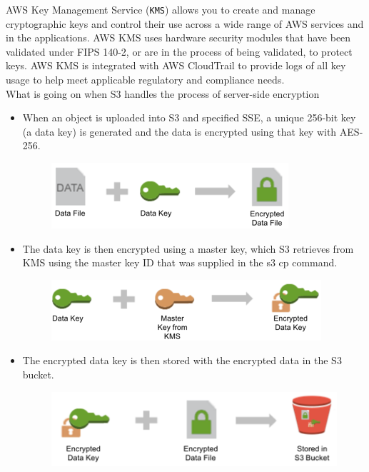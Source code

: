 \documentclass[10pt]{article}
\begin{document}
AWS Key Management Service (\texttt{KMS}) allows you to create and manage cryptographic keys and control their use across a wide range of AWS services and in the applications. AWS KMS uses hardware security modules that have been validated under FIPS 140-2, or are in the process of being validated, to protect keys. AWS KMS is integrated with AWS CloudTrail to provide logs of all key usage to help meet applicable regulatory and compliance needs. \cite{aws-kms}
\\
What is going on when S3 handles the process of server-side encryption \cite{encryption-with-aws-kms}
\begin{itemize}
    \item When an object is uploaded into S3 and specified SSE, a unique 256-bit key (a data key) is generated and the data is encrypted using that key with AES-256.
    \begin{figure}[h!]
    	\centering
    	\includegraphics[width=0.4\linewidth]{images/KMSDiagram1.PNG}	
    \end{figure}
    \item The data key is then encrypted using a master key, which S3 retrieves from KMS using the master key ID that was supplied in the s3 cp command.
   \begin{figure}[h!]
   	\centering
   	\includegraphics[width=0.4\linewidth]{images/KMSDiagram2.PNG}	
   \end{figure}
    \item The encrypted data key is then stored with the encrypted data in the S3 bucket.
    \begin{figure}[h!]
    	\centering
    	\includegraphics[width=0.4\linewidth]{images/KMSDiagram3.PNG}	
    \end{figure}
\end{itemize}
\end{document}

